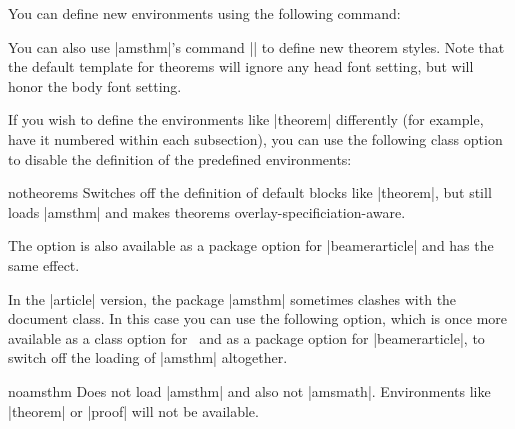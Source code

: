 You can define new environments using the following command:


You can also use |amsthm|'s command |\newtheoremstyle| to define new
theorem styles. Note that the default template for theorems will
ignore any head font setting, but will honor the body font setting.

If you wish to define the environments like |theorem| differently (for
example, have it numbered within each subsection), you can use the
following class option to disable the definition of the predefined
environments:

\begin{classoption}{notheorems}
  Switches off the definition of default blocks like |theorem|, but
  still loads |amsthm| and makes theorems
  overlay-specificiation-aware.
\end{classoption}

The option is also available as a package option for
|beamerarticle| and has the same effect.

\articlenote
In the |article| version, the package |amsthm| sometimes clashes with
the document class. In this case you can use the following option,
which is once more available as a class option for \beamer\ and as a
package option for |beamerarticle|, to switch off the loading of
|amsthm| altogether.

\begin{classoption}{noamsthm}
  Does not load |amsthm| and also not |amsmath|. Environments like
  |theorem| or |proof| will not be available.
\end{classoption}



